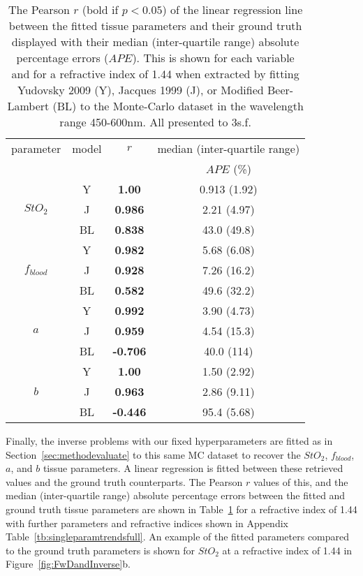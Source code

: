 \begin{table}[htpb]
    \centering
    \caption{The  Pearson $r$ (bold if $p<0.05$) of the linear regression line between the fitted tissue parameters and their ground truth displayed with their median (inter-quartile range) absolute percentage errors ($APE$). This is shown for each variable and for a refractive index of 1.44 when extracted by fitting Yudovsky 2009 (Y), Jacques 1999 (J), or Modified Beer-Lambert (BL) to the Monte-Carlo dataset in the wavelength range 450-600nm. All presented to 3s.f.}
    \begin{tabular}{|cc|cc|}
        \hline
        parameter & model & $r$ & median (inter-quartile range) \\
        & &  & $APE$ (\%)\\
        \hline
        \multirow{3}{*}{$StO_2$} & Y & \textbf{1.00} & 0.913 (1.92) \\
        & J & \textbf{0.986} & 2.21 (4.97) \\
        & BL & \textbf{0.838} & 43.0 (49.8) \\
        \hline
        \multirow{3}{*}{$f_{blood}$} & Y & \textbf{0.982} & 5.68 (6.08) \\
        & J & \textbf{0.928} & 7.26 (16.2) \\
        & BL & \textbf{0.582} & 49.6 (32.2) \\
        \hline
        \multirow{3}{*}{$a$} & Y & \textbf{0.992} & 3.90 (4.73) \\
        & J & \textbf{0.959} & 4.54 (15.3) \\
        & BL & \textbf{-0.706} & 40.0 (114) \\
        \hline
        \multirow{3}{*}{$b$} & Y & \textbf{1.00} & 1.50 (2.92) \\
        & J & \textbf{0.963} & 2.86 (9.11) \\
        & BL & \textbf{-0.446} & 95.4 (5.68) \\
        \hline
    \end{tabular}
    \label{tb:singleparamtrends}
\end{table}

Finally, the inverse problems with our fixed hyperparameters are fitted as in Section~\ref{sec:methodevaluate} to this same MC dataset to recover the $StO_2$, $f_{blood}$, $a$, and $b$ tissue parameters. A linear regression is fitted between these retrieved values and the ground truth counterparts. The Pearson $r$ values of this, and the median (inter-quartile range) absolute percentage errors between the fitted and ground truth tissue parameters are shown in Table~\ref{tb:singleparamtrends} for a refractive index of 1.44 with further parameters and refractive indices shown in Appendix Table~\ref{tb:singleparamtrendsfull}. An example of the fitted parameters compared to the ground truth parameters is shown for $StO_2$ at a refractive index of 1.44 in Figure~\ref{fig:FwDandInverse}b. 



